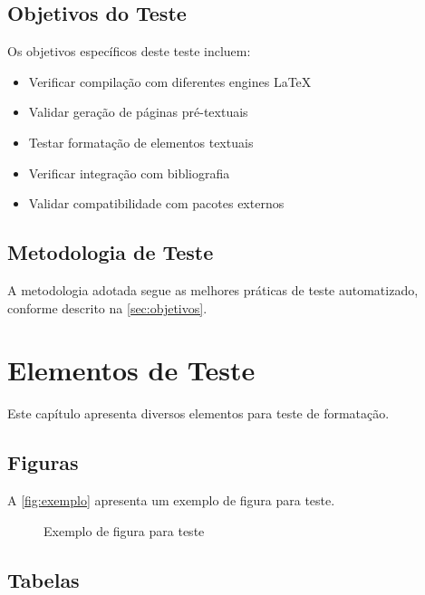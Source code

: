 \documentclass[mestrado,onehalfspacing,12pt,hyperref]{UnB-PPGT}
\begin{document}
\section{Objetivos do Teste}
\label{sec:objetivos}

Os objetivos específicos deste teste incluem:

\begin{itemize}
\item Verificar compilação com diferentes engines LaTeX
\item Validar geração de páginas pré-textuais
\item Testar formatação de elementos textuais
\item Verificar integração com bibliografia
\item Validar compatibilidade com pacotes externos
\end{itemize}

\section{Metodologia de Teste}
\label{sec:metodologia}

A metodologia adotada segue as melhores práticas de teste automatizado, conforme descrito na \autoref{sec:objetivos}.

\chapter{Elementos de Teste}
\label{cap:elementos}

Este capítulo apresenta diversos elementos para teste de formatação.

\section{Figuras}
\label{sec:figuras}

A \autoref{fig:exemplo} apresenta um exemplo de figura para teste.

\begin{figure}[htbp]
\centering
{}
\caption{Exemplo de figura para teste}
\label{fig:exemplo}
\end{figure}

\section{Tabelas}
\label{sec:tabelas}
\end{document}
